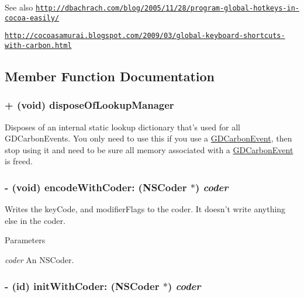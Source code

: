 \begin{DoxySeeAlso}{See also}
\href{http://dbachrach.com/blog/2005/11/28/program-global-hotkeys-in-cocoa-easily/}{\tt http://dbachrach.com/blog/2005/11/28/program-\/global-\/hotkeys-\/in-\/cocoa-\/easily/} 

\href{http://cocoasamurai.blogspot.com/2009/03/global-keyboard-shortcuts-with-carbon.html}{\tt http://cocoasamurai.blogspot.com/2009/03/global-\/keyboard-\/shortcuts-\/with-\/carbon.html} 
\end{DoxySeeAlso}


\subsection{Member Function Documentation}
\hypertarget{interface_g_d_carbon_event_aa9b7f189c2fdbe7d0424803cd3e7f936}{
\subsubsection[{disposeOfLookupManager}]{\setlength{\rightskip}{0pt plus 5cm}+ (void) disposeOfLookupManager }}
\label{interface_g_d_carbon_event_aa9b7f189c2fdbe7d0424803cd3e7f936}


Disposes of an internal static lookup dictionary that's used for all GDCarbonEvents. You only need to use this if you use a \hyperlink{interface_g_d_carbon_event}{GDCarbonEvent}, then stop using it and need to be sure all memory associated with a \hyperlink{interface_g_d_carbon_event}{GDCarbonEvent} is freed. \hypertarget{interface_g_d_carbon_event_af27ec25443a878f8d2a729a42a00f7d2}{
\subsubsection[{encodeWithCoder:}]{\setlength{\rightskip}{0pt plus 5cm}-\/ (void) encodeWithCoder: (NSCoder $\ast$) {\em coder}}}
\label{interface_g_d_carbon_event_af27ec25443a878f8d2a729a42a00f7d2}


Writes the keyCode, and modifierFlags to the coder. It doesn't write anything else in the coder.


\begin{DoxyParams}{Parameters}
\item[{\em coder}]An NSCoder. \end{DoxyParams}
\hypertarget{interface_g_d_carbon_event_a71262006d04ebd860b73e24a63dd0aa0}{
\subsubsection[{initWithCoder:}]{\setlength{\rightskip}{0pt plus 5cm}-\/ (id) initWithCoder: (NSCoder $\ast$) {\em coder}}}
\label{interface_g_d_carbon_event_a71262006d04ebd860b73e24a63dd0aa0}


